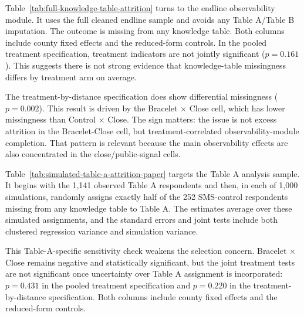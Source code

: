 \documentclass[11pt]{article}
\begin{document}
\clearpage

Table~\ref{tab:full-knowledge-table-attrition} turns to the endline observability module. It uses the full cleaned endline sample and avoids any Table A/Table B imputation. The outcome is missing from any knowledge table. Both columns include county fixed effects and the reduced-form controls. In the pooled treatment specification, treatment indicators are not jointly significant ($p=0.161$). This suggests there is not strong evidence that knowledge-table missingness differs by treatment arm on average.

The treatment-by-distance specification does show differential missingness ($p=0.002$). This result is driven by the Bracelet $\times$ Close cell, which has lower missingness than Control $\times$ Close. The sign matters: the issue is not excess attrition in the Bracelet-Close cell, but treatment-correlated observability-module completion. That pattern is relevant because the main observability effects are also concentrated in the close/public-signal cells.

\begin{table}[htbp]
\caption{Knowledge-Table Attrition: Full Endline Sample}
\label{tab:full-knowledge-table-attrition}
\scriptsize

\end{table}

\clearpage

Table~\ref{tab:simulated-table-a-attrition-paper} targets the Table A analysis sample. It begins with the 1,141 observed Table A respondents and then, in each of 1,000 simulations, randomly assigns exactly half of the 252 SMS-control respondents missing from any knowledge table to Table A. The estimates average over these simulated assignments, and the standard errors and joint tests include both clustered regression variance and simulation variance.

This Table-A-specific sensitivity check weakens the selection concern. Bracelet $\times$ Close remains negative and statistically significant, but the joint treatment tests are not significant once uncertainty over Table A assignment is incorporated: $p=0.431$ in the pooled treatment specification and $p=0.220$ in the treatment-by-distance specification. Both columns include county fixed effects and the reduced-form controls.

\begin{table}[htbp]
\caption{Knowledge-Table Attrition: Simulated Table A Sample}
\label{tab:simulated-table-a-attrition-paper}
\scriptsize

\end{table}
\end{document}
